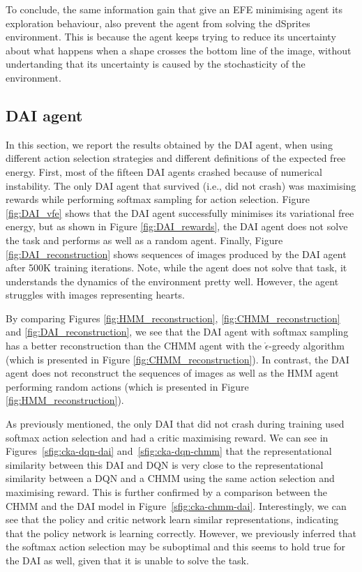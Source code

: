 \documentclass[twoside,11pt]{article}
\begin{document}
To conclude, the same information gain that give an EFE minimising agent its exploration behaviour, also prevent the agent from solving the dSprites environment. This is because the agent keeps trying to reduce its uncertainty about what happens when a shape crosses the bottom line of the image, without undertanding that its uncertainty is caused by the stochasticity of the environment.

\subsection{DAI agent} \label{ssec:dai_results}

In this section, we report the results obtained by the DAI agent, when using different action selection strategies and different definitions of the expected free energy. First, most of the fifteen DAI agents crashed because of numerical instability. The only DAI agent that survived (i.e., did not crash) was maximising rewards while performing softmax sampling for action selection. Figure \ref{fig:DAI_vfe} shows that the DAI agent successfully minimises its variational free energy, but as shown in Figure \ref{fig:DAI_rewards}, the DAI agent does not solve the task and performs as well as a random agent. Finally, Figure \ref{fig:DAI_reconstruction} shows sequences of images produced by the DAI agent after 500K training iterations. Note, while the agent does not solve that task, it understands the dynamics of the environment pretty well. However, the agent struggles with images representing hearts.

By comparing Figures \ref{fig:HMM_reconstruction}, \ref{fig:CHMM_reconstruction} and \ref{fig:DAI_reconstruction}, we see that the DAI agent with softmax sampling has a better reconstruction than the CHMM agent with the $\mathring{\epsilon}$-greedy algorithm (which is presented in Figure \ref{fig:CHMM_reconstruction}). In contrast, the DAI agent does not reconstruct the sequences of images as well as the HMM agent performing random actions (which is presented in Figure \ref{fig:HMM_reconstruction}).

As previously mentioned, the only DAI that did not crash during training used softmax action selection and had a critic maximising reward. We can see in Figures~\ref{sfig:cka-dqn-dai} and~\ref{sfig:cka-dqn-chmm} that the representational similarity between this DAI and DQN is very close to the representational similarity between a DQN and a CHMM using the same action selection and maximising reward. This is further confirmed by a comparison between the CHMM and the DAI model in Figure~\ref{sfig:cka-chmm-dai}. Interestingly, we can see that the policy and critic network learn similar representations, indicating that the policy network is learning correctly. However, we previously inferred that the softmax action selection may be suboptimal and this seems to hold true for the DAI as well, given that it is unable to solve the task.
\end{document}
